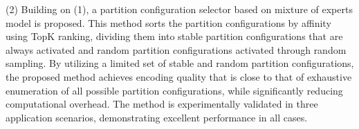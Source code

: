 \begin{abstract*}
  (2) Building on (1), a partition configuration selector based on mixture of experts model is proposed. 
  This method sorts the partition configurations by affinity using TopK ranking, 
  dividing them into stable partition configurations that are always activated and 
  random partition configurations activated through random sampling. 
  By utilizing a limited set of stable and random partition configurations, the proposed method achieves encoding quality that is close to that of exhaustive enumeration of all possible partition configurations, while significantly reducing computational overhead.
  The method is experimentally validated in three application scenarios, demonstrating excellent performance in all cases.

\end{abstract*}

